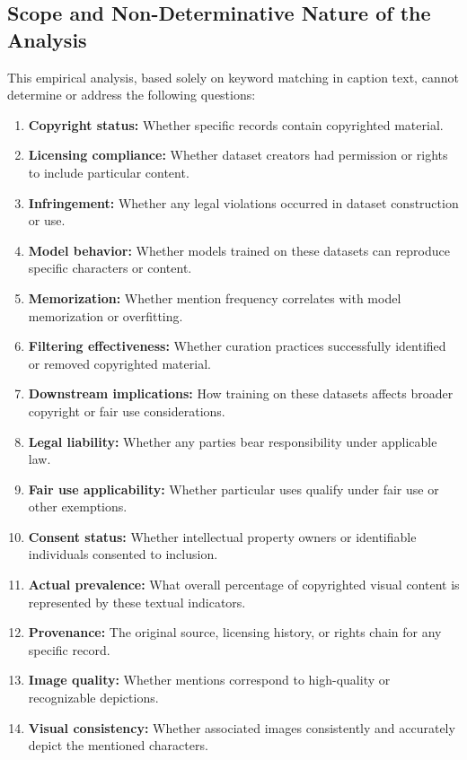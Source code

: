 \documentclass[11pt]{article}
\begin{document}
\subsection{Scope and Non-Determinative Nature of the Analysis}
This empirical analysis, based solely on keyword matching in caption text, cannot determine or address the following questions:

\begin{enumerate}
\item \textbf{Copyright status:} Whether specific records contain copyrighted material.
\item \textbf{Licensing compliance:} Whether dataset creators had permission or rights to include particular content.
\item \textbf{Infringement:} Whether any legal violations occurred in dataset construction or use.
\item \textbf{Model behavior:} Whether models trained on these datasets can reproduce specific characters or content.
\item \textbf{Memorization:} Whether mention frequency correlates with model memorization or overfitting.
\item \textbf{Filtering effectiveness:} Whether curation practices successfully identified or removed copyrighted material.
\item \textbf{Downstream implications:} How training on these datasets affects broader copyright or fair use considerations.
\item \textbf{Legal liability:} Whether any parties bear responsibility under applicable law.
\item \textbf{Fair use applicability:} Whether particular uses qualify under fair use or other exemptions.
\item \textbf{Consent status:} Whether intellectual property owners or identifiable individuals consented to inclusion.
\item \textbf{Actual prevalence:} What overall percentage of copyrighted visual content is represented by these textual indicators.
\item \textbf{Provenance:} The original source, licensing history, or rights chain for any specific record.
\item \textbf{Image quality:} Whether mentions correspond to high-quality or recognizable depictions.
\item \textbf{Visual consistency:} Whether associated images consistently and accurately depict the mentioned characters.
\end{enumerate}
\end{document}
